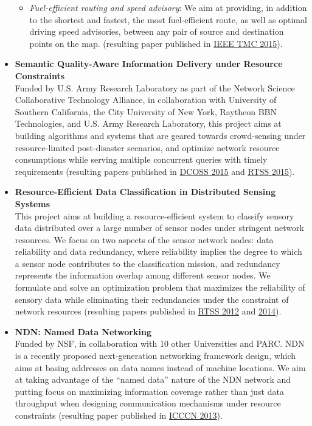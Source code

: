 \begin{itemize}
\begin{itemize}
\item {\em Fuel-efficient routing and speed advisory}: We aim at providing, in addition to the shortest and fastest, the most fuel-efficient route, as well as optimal driving speed advisories, between any pair of source and destination points on the map. (resulting paper published in \hyperlink{saremi2015tmc}{\textsc{IEEE TMC 2015}}).
\end{itemize}

\item \textbf{Semantic Quality-Aware Information Delivery under Resource Constraints}\\ Funded by U.S. Army Research Laboratory as part of the Network Science Collaborative Technology Alliance, in collaboration with University of Southern California, the City University of New York, Raytheon BBN Technologies, and U.S. Army Research Laboratory, this project aims at building algorithms and systems that are geared towards crowd-sensing under resource-limited post-disaster scenarios, and optimize network resource consumptions while serving multiple concurrent queries with timely requirements (resulting papers published in \hyperlink{hu2015dcoss}{\textsc{DCOSS 2015}} and \hyperlink{hu2015rtss}{\textsc{RTSS 2015}}).

\item \textbf{Resource-Efficient Data Classification in Distributed Sensing Systems} \\
This project aims at building a resource-efficient system to classify sensory data distributed over a large number of sensor nodes under stringent network resources. We focus on two aspects of the sensor network nodes: data reliability and data redundancy, where reliability implies the degree to which a sensor node contributes to the classification mission, and redundancy represents the information overlap among different sensor nodes. We formulate and solve an optimization problem that maximizes the reliability of sensory data while eliminating their redundancies under the constraint of network resources (resulting papers published in \hyperlink{su2012rtss}{\textsc{RTSS 2012}} and \hyperlink{su2014rtss}{\textsc{2014}}).

\item \textbf{NDN: Named Data Networking} \\
Funded by NSF, in collaboration with 10 other Universities and PARC. NDN is a recently proposed next-generation networking framework design, which aims at basing addresses on data names instead of machine locations. We aim at taking advantage of the ``named data'' nature of the NDN network and putting focus on maximizing information coverage rather than just data throughput when designing communication mechanisms under resource constraints (resulting paper published in \hyperlink{wang2013icccn}{\textsc{ICCCN 2013}}).

\end{itemize}

